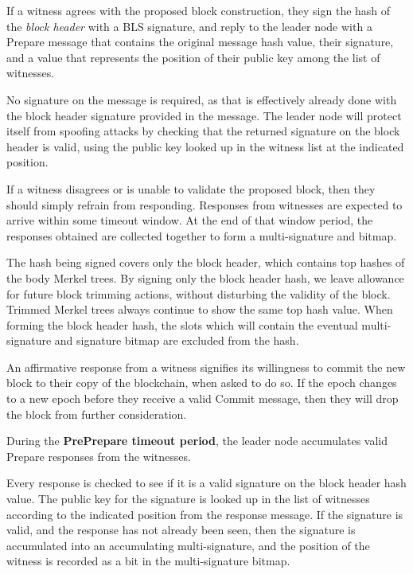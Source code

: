 \documentclass[a4paper, 10pt, conference]{ieeeconf}
\begin{document}
\begin{itemize}
{If a witness agrees with the proposed block construction, they sign the hash of the \textit{block header} with a BLS signature, and reply to the leader node with a Prepare message that contains the original message hash value, their signature, and a value that represents the position of their public key among the list of witnesses. 

No signature on the message is required, as that is effectively already done with the block header signature provided in the message. The leader node will protect itself from spoofing attacks by checking that the returned signature on the block header is valid, using the public key looked up in the witness list at the indicated position.

If a witness disagrees or is unable to validate the proposed block, then they should simply refrain from responding. Responses from witnesses are expected to arrive within some timeout window. At the end of that window period, the responses obtained are collected together to form a multi-signature and bitmap.

The hash being signed covers only the block header, which contains top hashes of the body Merkel trees. By signing only the block header hash, we leave allowance for future block trimming actions, without disturbing the validity of the block. Trimmed Merkel trees always continue to show the same top hash value. When forming the block header hash, the slots which will contain the eventual multi-signature and signature bitmap are excluded from the hash.

An affirmative response from a witness signifies its willingness to commit the new block to their copy of the blockchain, when asked to do so. If the epoch changes to a new epoch before they receive a valid Commit message, then they will drop the block from further consideration. 

\item{During the \textbf{PrePrepare timeout period}, the leader node accumulates valid Prepare responses from the witnesses.

Every response is checked to see if it is a valid signature on the block header hash value. The public key for the signature is looked up in the list of witnesses according to the indicated position from the response message. If the signature is valid, and the response has not already been seen, then the signature is accumulated into an accumulating multi-signature, and the position of the witness is recorded as a bit in the multi-signature bitmap. 

}}
\end{itemize}
\end{document}
